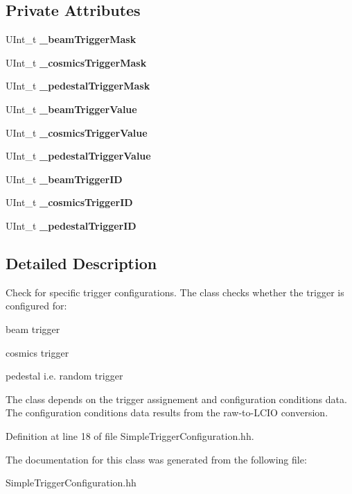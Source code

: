 \subsection*{Private Attributes}
\begin{DoxyCompactItemize}
\item 
UInt\_\-t {\bfseries \_\-beamTriggerMask}\label{classCALICE_1_1SimpleTriggerConfiguration_a4f370d097b812175b35ffe93c24f28e5}

\item 
UInt\_\-t {\bfseries \_\-cosmicsTriggerMask}\label{classCALICE_1_1SimpleTriggerConfiguration_a2764c219750efcaa915eea0bb3caa202}

\item 
UInt\_\-t {\bfseries \_\-pedestalTriggerMask}\label{classCALICE_1_1SimpleTriggerConfiguration_a849801e47b4836ea21fff1d1641729fc}

\item 
UInt\_\-t {\bfseries \_\-beamTriggerValue}\label{classCALICE_1_1SimpleTriggerConfiguration_ab35e7ca6bb5fa8015ca95edbebccd7f4}

\item 
UInt\_\-t {\bfseries \_\-cosmicsTriggerValue}\label{classCALICE_1_1SimpleTriggerConfiguration_a000314437dd78ab5b30eaf4e000d1f9a}

\item 
UInt\_\-t {\bfseries \_\-pedestalTriggerValue}\label{classCALICE_1_1SimpleTriggerConfiguration_a8c1f4b927fba0900d7d1fb7b1f0b6f93}

\item 
UInt\_\-t {\bfseries \_\-beamTriggerID}\label{classCALICE_1_1SimpleTriggerConfiguration_ab9f06639c466d303176f753fcf558861}

\item 
UInt\_\-t {\bfseries \_\-cosmicsTriggerID}\label{classCALICE_1_1SimpleTriggerConfiguration_a388c635ca49d3de1a65e3ac9682bcd4c}

\item 
UInt\_\-t {\bfseries \_\-pedestalTriggerID}\label{classCALICE_1_1SimpleTriggerConfiguration_a9451a02ca550fb7588b7cfebc76fda2b}

\end{DoxyCompactItemize}


\subsection{Detailed Description}
Check for specific trigger configurations. The class checks whether the trigger is configured for: 
\begin{DoxyItemize}
\item beam trigger 
\item cosmics trigger 
\item pedestal i.e. random trigger 
\end{DoxyItemize}The class depends on the trigger assignement and configuration conditions data. The configuration conditions data results from the raw-\/to-\/LCIO conversion. 

Definition at line 18 of file SimpleTriggerConfiguration.hh.

The documentation for this class was generated from the following file:\begin{DoxyCompactItemize}
\item 
SimpleTriggerConfiguration.hh\end{DoxyCompactItemize}
